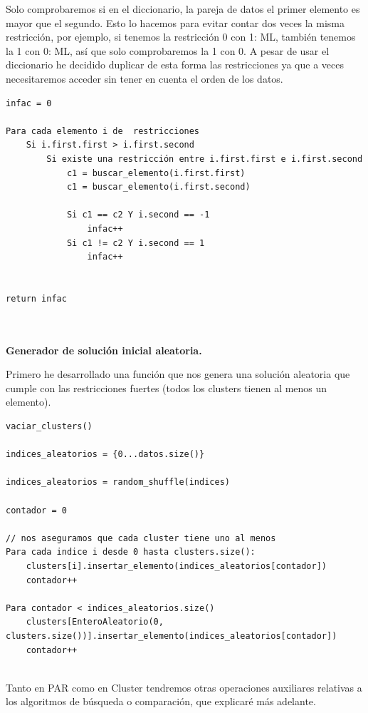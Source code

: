 \documentclass[12pt, spanish]{article}
\begin{document}
Solo comprobaremos si en el diccionario, la pareja de datos el primer elemento es mayor que el segundo. Esto lo hacemos para evitar contar dos veces la misma restricción, por ejemplo, si tenemos la restricción 0 con 1: ML, también tenemos la 1 con 0: ML, así que solo comprobaremos la 1 con 0. A pesar de usar el diccionario he decidido duplicar de esta forma las restricciones ya que a veces necesitaremos acceder sin tener en cuenta el orden de los datos.

\newpage

\begin{lstlisting}
infac = 0

Para cada elemento i de  restricciones
	Si i.first.first > i.first.second
		Si existe una restricción entre i.first.first e i.first.second
			c1 = buscar_elemento(i.first.first)
			c1 = buscar_elemento(i.first.second)
			
			Si c1 == c2 Y i.second == -1
				infac++
			Si c1 != c2 Y i.second == 1
				infac++
		
		
return infac
	
	
\end{lstlisting}



 \textbf{Generador de solución inicial aleatoria.}
 
 Primero he desarrollado una función que nos genera una solución aleatoria que cumple con las restricciones fuertes (todos los clusters tienen al menos un elemento).
 
 \begin{lstlisting}
vaciar_clusters()

indices_aleatorios = {0...datos.size()}

indices_aleatorios = random_shuffle(indices)

contador = 0

// nos aseguramos que cada cluster tiene uno al menos
Para cada indice i desde 0 hasta clusters.size():
	clusters[i].insertar_elemento(indices_aleatorios[contador])
	contador++
	
Para contador < indices_aleatorios.size()
	clusters[EnteroAleatorio(0, clusters.size())].insertar_elemento(indices_aleatorios[contador])
	contador++
	

\end{lstlisting}
 


Tanto en PAR como en Cluster tendremos otras operaciones auxiliares relativas a los algoritmos de búsqueda o comparación, que explicaré más adelante.
\end{document}
